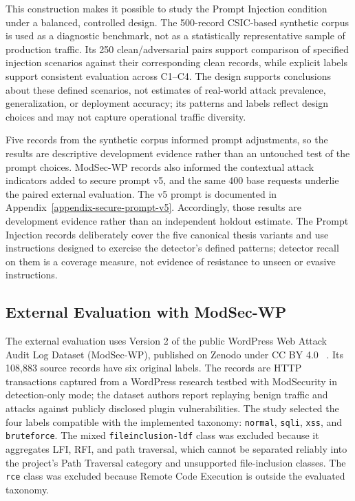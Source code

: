 This construction makes it possible to study the Prompt Injection
condition under a balanced, controlled design. The 500-record
CSIC-based synthetic corpus is used as a diagnostic benchmark, not as a
statistically representative sample of production traffic. Its 250
clean/adversarial pairs support
comparison of specified injection scenarios against their corresponding
clean records, while explicit labels support consistent evaluation
across C1--C4. The design supports conclusions about these defined
scenarios, not estimates of real-world attack prevalence, generalization,
or deployment accuracy; its patterns and labels reflect design choices
and may not capture operational traffic diversity.

Five records from the synthetic corpus informed prompt adjustments, so
the results are descriptive development evidence rather than an
untouched test of the prompt choices. ModSec-WP records also informed
the contextual attack indicators added to secure prompt v5, and the same
400 base requests underlie the paired external evaluation.
The v5 prompt is documented in Appendix~\ref{appendix-secure-prompt-v5}.
Accordingly, those results are development evidence rather than an
independent holdout estimate. The Prompt Injection records deliberately
cover the five canonical thesis variants and use instructions designed
to exercise the detector's defined patterns; detector recall on them is
a coverage measure, not evidence of resistance to unseen or evasive
instructions.

\subsection{External Evaluation with ModSec-WP}
\label{modsec-external-evaluation}

The external evaluation uses Version 2 of the public WordPress Web Attack
Audit Log Dataset (ModSec-WP), published on Zenodo under CC BY 4.0
~\cite{modsecwp2026dataset}. Its 108{,}883 source records have six
original labels. The records are HTTP transactions captured from a
WordPress research testbed with ModSecurity in detection-only mode; the
dataset authors report replaying benign traffic and attacks against
publicly disclosed plugin vulnerabilities. The study selected the four
labels compatible with the implemented taxonomy: \texttt{normal},
\texttt{sqli}, \texttt{xss}, and \texttt{bruteforce}. The mixed
\texttt{fileinclusion-ldf} class was excluded because it aggregates LFI,
RFI, and path traversal, which cannot be separated reliably into the
project's Path Traversal category and unsupported file-inclusion
classes. The \texttt{rce} class was excluded because Remote Code
Execution is outside the evaluated taxonomy.

